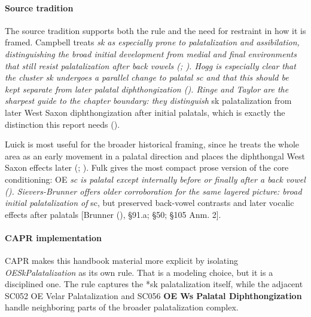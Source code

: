 \documentclass[
  british,
  a4paper,
]{article}
\begin{document}
\paragraph{Source tradition}\label{source-tradition-31}

The source tradition supports both the rule and the need for restraint
in how it is framed. Campbell treats \emph{sk as especially prone to
palatalization and assibilation, distinguishing the broad initial
development from medial and final environments that still resist
palatalization after back vowels (; ).
Hogg is especially clear that the cluster sk undergoes a parallel change
to palatal sc and that this should be kept separate from later palatal
diphthongization ().
Ringe and Taylor are the sharpest guide to the chapter boundary: they
distinguish }sk palatalization from later West Saxon diphthongization
after initial palatals, which is exactly the distinction this report
needs ().

Luick is most useful for the broader historical framing, since he treats
the whole area as an early movement in a palatal direction and places
the diphthongal West Saxon effects later (; ). Fulk gives the most compact prose version of the core
conditioning: OE \emph{sc is palatal except internally before or finally
after a back vowel ().
Sievers-Brunner offers older corroboration for the same layered picture:
broad initial palatalization of }sc, but preserved back-vowel contrasts
and later vocalic effects after palatals {[}Brunner
(), §91.a; §50; §105 Anm. 2{]}.

\paragraph{CAPR implementation}\label{capr-implementation-31}

CAPR makes this handbook material more explicit by isolating
\emph{OESkPalatalization} as its own rule. That is a modeling choice,
but it is a disciplined one. The rule captures the *sk palatalization
itself, while the adjacent SC052 OE Velar Palatalization and SC056
\textbf{OE Ws Palatal Diphthongization} handle neighboring parts of the
broader palatalization complex.
\end{document}
